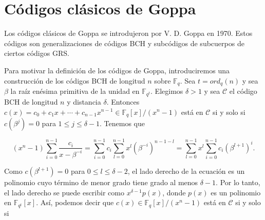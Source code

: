 \begin{comment}
A continuación, introduciremos la definición de los códigos Reed-Solomon generalizados.

Para $k \geq 0$, $\mathcal{P}_k$ denota el conjunto de polinomios de grado menor que $k$, incluyendo el polinomio nulo, en $\mathbb{F}_q[x]$. Sea $n$ un número entero tal que $1 \leq n \leq q$, $\gamma = (\gamma _0,..., \gamma _{n-1})$ una n-tupla de elementos distintos de $\mathbb{F}_q$, y $\textbf{v} = (v_0,...,v_{n-1})$ una n-tupla de elementos no nulos de $\mathbb{F}_q$. Sea $k$ un número entero tal que $1 \leq k \leq n$. Entonces los códigos

$$GRS_k (\gamma, \textbf{v}) = \left\{ \left( v_0 f(\gamma_0), ..., v_{n-1}f(\gamma_{n-1}) \right) : f \in \mathcal{P}_k \right\}$$

son los códigos Reed-Solomon generalizados (códigos GRS).
\end{comment}

\section{Códigos clásicos de Goppa}

Los códigos clásicos de Goppa se introdujeron por V. D. Goppa en 1970. Estos códigos son generalizaciones de códigos BCH y subcódigos de subcuerpos de ciertos códigos GRS.

Para motivar la definición de los códigos de Goppa, introduciremos una construcción de los códigos BCH de longitud $n$ sobre $\mathbb{F}_q$. Sea $t = ord_q(n)$ y sea $\beta$ la raíz enésima primitiva de la unidad en $\mathbb{F}_{q^t}$. Elegimos $\delta > 1$ y sea $\mathcal{C}$ el código BCH de longitud $n$ y distancia $\delta$. Entonces $c(x) = c_0 + c_1x + \cdots + c_{n-1}x^{n-1} \in \mathbb{F}_q [x] / (x^n - 1)$ está en $\mathcal{C}$ si y solo si $c(\beta^j) = 0$ para $1 \leq j \leq \delta - 1$. Tenemos que 

$$(x^n - 1) \sum_{i=0}^{n-1} \frac{c_i}{x - \beta ^{-i}} = \sum_{i=0}^{n-1} c_i \sum_{l=0}^{n-1} x^l \left( \beta ^{-i} \right) ^{n-1-l} = \sum_{l=0}^{n-1} x^l \sum_{i=0}^{n-1} c_i \left( \beta^{l+1} \right) ^i.$$

Como $c(\beta^{l+1}) = 0$ para $0 \leq l \leq \delta - 2$, el lado derecho de la ecuación es un polinomio cuyo término de menor grado tiene grado al menos $\delta - 1$. Por lo tanto, el lado derecho se puede escribir como $x^{\delta - 1} p(x)$, donde $p(x)$ es un polinomio en $\mathbb{F}_{q^t}[x]$. Así, podemos decir que $c(x) \in \mathbb{F}_q[x] / (x^n - 1)$ está en $\mathcal{C}$ si y solo si 

